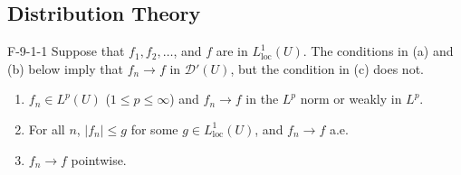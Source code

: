 \documentclass{article}
\begin{document}
	\subsection{Distribution Theory}
	\begin{prb}{F-9-1-1}
		Suppose that $f_{1}, f_{2}, \ldots$, and $f$ are in $L^{1}_{\text{loc}}(U)$. The conditions in (a) and (b) below imply that $f_{n} \to f$ in $\mathcal{D}'(U)$, but the condition in (c) does not. \vspace{-0.25cm}
		\begin{enumerate}[itemsep =-2pt,label = \textbf{\alph{*}.}]
			\item $f_{n} \in L^{p}(U)$ ($1 \leq p \leq \infty$) and $f_{n} \to f$ in the $L^{p}$ norm or weakly in $L^{p}$. 
			\item For all $n$, $|f_{n}|\leq g$ for some $g \in L^{1}_{\text{loc}}(U)$, and $f_{n} \to f$ a.e. 
			\item $f_{n} \to f$ pointwise. 
		\end{enumerate}
	\end{prb}
\end{document}
